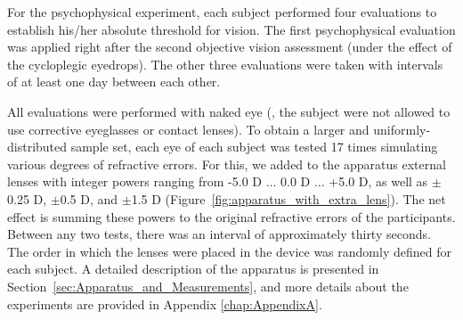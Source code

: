 For the psychophysical experiment, each subject performed four  evaluations to establish his/her absolute threshold for vision. The first psychophysical evaluation was applied right after the second objective vision assessment (under the effect of the cycloplegic eyedrops). The other three evaluations were taken with intervals of at least one day between each other. 

All evaluations were performed with naked eye (\ie, the subject were not allowed to use corrective eyeglasses or contact lenses). 
To obtain a larger and uniformly-distributed sample set, each eye of each subject was tested 17 times simulating various degrees of refractive errors. For this, we added to the apparatus external lenses with integer powers ranging from -5.0 D $\hdots$ 0.0 D $\hdots$ +5.0 D, as well as $\pm$0.25 D, $\pm$0.5 D, and $\pm$1.5 D (Figure~\ref{fig:apparatus_with_extra_lens}). The net effect is summing these powers to the original refractive errors of the participants. Between any two tests, there was an interval of approximately thirty seconds.
The order in which the lenses were placed in the device was randomly defined for each subject. 
A detailed description of the apparatus is presented in Section~\ref{sec:Apparatus_and_Measurements}, and more details about the experiments are provided 
in Appendix \ref{chap:AppendixA}.

